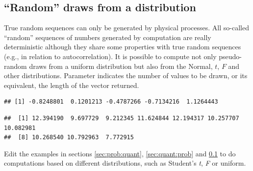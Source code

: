 \documentclass[krantz2]{krantz}\usepackage{knitr}
\begin{document}
\subsection{``Random'' draws from a distribution}\label{sec:stat:random}

True random sequences can only be generated by physical processes. All so-called ``random'' sequences of numbers generated by computation are really deterministic although they share some properties with true random sequences (e.g.,  in relation to autocorrelation). It is possible to compute not only pseudo-random draws from a uniform distribution but also from the Normal, $t$, $F$ and other distributions. Parameter  indicates the number of values to be drawn, or its equivalent, the length of the vector returned.

\begin{knitrout}\footnotesize
{}\color{fgcolor}\begin{kframe}
\begin{alltt}
\hlstd{(}\hlstd{)}
\end{alltt}
\begin{verbatim}
## [1] -0.8248801  0.1201213 -0.4787266 -0.7134216  1.1264443
\end{verbatim}
\begin{alltt}
\hlstd{(} \hlstd{=} \hlstd{,}  \hlstd{=} \hlstd{,}  \hlstd{=} \hlstd{)}
\end{alltt}
\begin{verbatim}
##  [1] 12.394190  9.697729  9.212345 11.624844 12.194317 10.257707 10.082981
##  [8] 10.268540 10.792963  7.772915
\end{verbatim}
\end{kframe}
\end{knitrout}

\begin{playground}
Edit the examples in sections \ref{sec:prob:quant}, \ref{sec:quant:prob} and \ref{sec:stat:random} to do computations based on different distributions, such as Student's \emph{t}, \emph{F} or uniform.
\end{playground}
\end{document}
